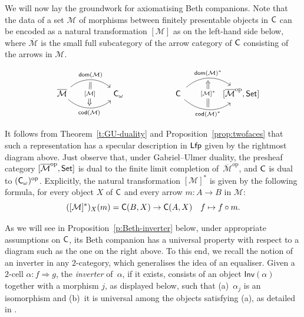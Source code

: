 \documentclass[a4paper,10pt,reqno]{amsart}
\theoremstyle{definition}
\theoremstyle{remark}
\newcommand{\cat}{{\sf C}}								%
\newcommand{\Set}{{\sf Set}}								%
\newcommand{\Lfp}{{\sf Lfp}}								%
\newcommand{\ar}[1]{\mathcal{#1}}							%
\newcommand{\op}{{\mathrm{op}}}						%
\begin{document}
We will now lay the groundwork for axiomatising Beth companions. Note that the data of a set $\ar{M}$ of morphisms between finitely presentable objects in $\cat$ can be encoded as a natural transformation $[\ar{M}]$ as on the left-hand side below, where $\overline{\ar{M}}$ is the small full subcategory of the arrow category of $\cat$ consisting of the arrows in $\ar{M}$.

\[
\begin{tikzcd}
	\overline{\mathcal{M}}
	&& {\cat_\omega}
	&& {\makebox[0.7cm][c]{$\cat$}}
	&& {\makebox[0.7cm][c]{$[\overline{\mathcal{M}}^{\op},\Set]$}}
	\arrow[""{name=0, anchor=center, inner sep=0},
		"{\mathsf{dom}(\mathcal{M})}",
		bend left=40, from=1-1, to=1-3]
	\arrow[""{name=1, anchor=center, inner sep=0},
		"{\mathsf{cod}(\mathcal{M})}"',
		bend right=40, from=1-1, to=1-3]
	\arrow[""{name=2, anchor=center, inner sep=0},
		"{\mathsf{dom}(\mathcal{M})^*}",
		bend left=40, from=1-5, to=1-7]
	\arrow[""{name=3, anchor=center, inner sep=0},
		"{\mathsf{cod}(\mathcal{M})^*}"',
		bend right=40, from=1-5, to=1-7,shorten >=3pt]
	\arrow["{[\mathcal{M}]}"{description}, Rightarrow,
		from=0, to=1, shorten <=2pt, shorten >=2pt]
	\arrow["{[\mathcal{M}]^*}"{description}, Rightarrow,
		from=3, to=2, shorten <=2pt, shorten >=2pt]
\end{tikzcd}
\]

It follows from Theorem~\ref{t:GU-duality} and Proposition~\ref{prop:twofaces} that such a representation has a specular description in $\Lfp$ given by the rightmost diagram above. Just observe that, under Gabriel--Ulmer duality, the presheaf category $[\overline{\ar{M}}^\op,\Set]$ is dual to the finite limit completion of~$\overline{\ar{M}}^\op$, and $\cat$ is dual to $(\cat_\omega)^\op$. 
%
Explicitly, the natural transformation $[\ar{M}]^*$ is given by the following formula, for every object $X$ of $\cat$ and every arrow $m\colon A \to B$ in $\ar{M}$:
\[
([\ar{M}]^*)_X(m) = \cat(B,X) \to \cat(A,X) \quad f \mapsto f \circ m.
\]

As we will see in Proposition~\ref{p:Beth-inverter} below, under appropriate assumptions on $\cat$, its Beth companion has a universal property with respect to a diagram such as the one on the right above. To this end, we recall the notion of an inverter in any $2$-category, which generalises the idea of an equaliser.
%
Given a $2$-cell $\alpha \colon f\Rightarrow g$, the \emph{inverter} of~$\alpha$, if it exists, consists of an object $\mathsf{Inv}(\alpha)$ together with a morphism $j$, as displayed below, such that (a)~$\alpha_j$ is an isomorphism and (b)~it is universal among the objects satisfying (a), as detailed in \cite[\S 4, p.~310]{Kelly1989}.
\end{document}
